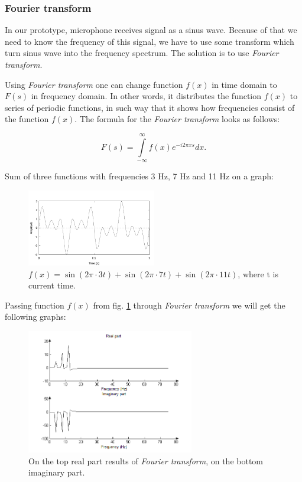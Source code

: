 \documentclass[11pt,titlepage]{article}
\theoremstyle{plain}
\begin{document}
\subsubsection{Fourier transform}
In our prototype, microphone receives signal as a sinus wave. Because of that we need to know the frequency of this signal, we have to use some transform which turn sinus wave into the frequency spectrum. The solution is to use \textit{Fourier transform}.

\vspace{5mm}

Using \textit{Fourier transform} one can change function $f(x)$ in time domain to $F(s)$ in frequency domain. In other words, it distributes the function $f(x)$ to series of periodic functions, in such way that it shows how frequencies consist of the function $f(x)$. The formula for the \textit{Fourier transform} looks as follows:

\begin{equation}
	F(s) = \int\limits^\infty_{-\infty} f(x) e^{-i2\pi xs} dx.
\end{equation}

Sum of three functions with frequencies 3 Hz, 7 Hz and 11 Hz on a graph:
\begin{figure}[H]
	\centering
	\includegraphics[width=0.5\textwidth]{img/sines}
	\caption{$f(x) = \sin(2\pi \cdot 3t)+\sin(2 \pi \cdot 7 t)+\sin(2  \pi \cdot 11  t)$, where t is current time.}
	\label{fig:F4}
\end{figure}

Passing function $f(x)$ from fig. \ref{fig:F4} through \textit{Fourier transform} we will get the following graphs:

\begin{figure}[H]
	\centering
	\includegraphics[width=0.65\textwidth]{img/both_real_imag}
	\caption{On the top real part results of \textit{Fourier transform}, on the bottom imaginary part.}
	\label{fig:F5}
\end{figure}
\end{document}
